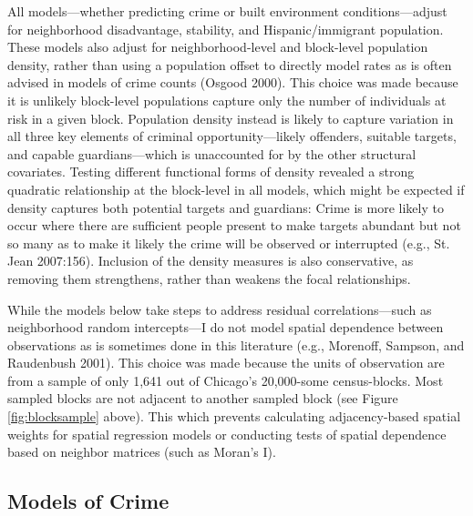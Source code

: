 \documentclass [11pt, proquest] {uwthesis}[2015/03/03]
\begin{document}
All models---whether predicting crime or built environment conditions---adjust for neighborhood disadvantage, stability, and Hispanic/immigrant population. These models also adjust for neighborhood-level and block-level population density, rather than using a population offset to directly model rates as is often advised in models of crime counts (Osgood 2000). This choice was made because it is unlikely block-level populations capture only the number of individuals at risk in a given block. Population density instead is likely to capture variation in all three key elements of criminal opportunity---likely offenders, suitable targets, and capable guardians---which is unaccounted for by the other structural covariates. Testing different functional forms of density revealed a strong quadratic relationship at the block-level in all models, which might be expected if density captures both potential targets and guardians: Crime is more likely to occur where there are sufficient people present to make targets abundant but not so many as to make it likely the crime will be observed or interrupted (e.g., St. Jean 2007:156). Inclusion of the density measures is also conservative, as removing them strengthens, rather than weakens the focal relationships.

While the models below take steps to address residual correlations---such as neighborhood random intercepts---I do not model spatial dependence between observations as is sometimes done in this literature (e.g., Morenoff, Sampson, and Raudenbush 2001). This choice was made because the units of observation are from a sample of only 1,641 out of Chicago's 20,000-some census-blocks. Most sampled blocks are not adjacent to another sampled block (see Figure \ref{fig:blocksample} above). This which prevents calculating adjacency-based spatial weights for spatial regression models or conducting tests of spatial dependence based on neighbor matrices (such as Moran's I).

\hypertarget{models-of-crime}{%
\subsection{Models of Crime}\label{models-of-crime}}
\end{document}
